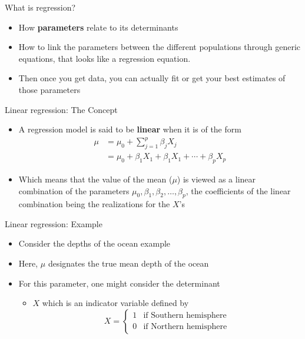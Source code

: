 \documentclass[10pt,handout]{beamer}\usepackage[]{graphicx}\usepackage[]{color}
\begin{document}
\begin{frame}{What is regression?}
	
	\begin{itemize}
		\setlength\itemsep{2em}
		\item How \textbf{parameters} relate to its determinants 
		\item How to link the parameters between the different populations through generic equations, that looks like a regression equation.  
		\item Then once you get data, you can actually fit or get your best estimates of those parameters
	\end{itemize}
	
\end{frame}

\begin{frame}{Linear regression: The Concept}
	
	\begin{itemize}
		\setlength\itemsep{2em}
		\item A regression model is said to be \textbf{linear} when it is of the form 
		\begin{align*}
			\mu & = \mu_0 + \sum_{j=1}^p \beta_j X_j \\
			& = \mu_0 + \beta_1 X_1 +  \beta_1 X_1 + \cdots +  \beta_p X_p
		\end{align*}
		
		\item Which means that the value of the mean ($\mu$) is viewed as a linear combination of the parameters $\mu_0, \beta_1, \beta_2, \ldots, \beta_p$, the coefficients of the linear combination being the realizations for the $X$'s
		
	\end{itemize}
	
\end{frame}

\begin{frame}{Linear regression: Example}
	
	\begin{itemize}
		\setlength\itemsep{2em}
		\item Consider the depths of the ocean example
		\item Here, $\mu$ designates the true mean depth of the ocean 
		\item For this parameter, one might consider the determinant 
		\begin{itemize}
			\item $X$ which is an indicator variable defined by			
			$$
			X = \begin{cases}
			1 & \textrm{if Southern hemisphere}\\
			0 & \textrm{if Northern hemisphere}
			\end{cases}
			$$
			
		\end{itemize} 
		
	\end{itemize}
	
\end{frame}
\end{document}
